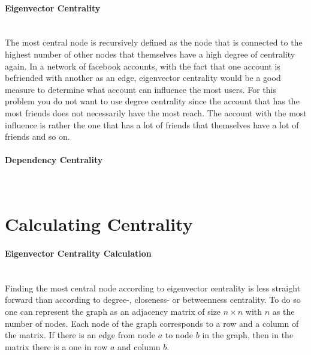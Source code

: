 \paragraph{Eigenvector Centrality}\mbox{} \medskip \\
The most central node is recursively defined as the node that is connected to the highest number
of other nodes that themselves have a high degree of centrality again. In a network of facebook
accounts, with the fact that one account is befriended with another as an edge, eigenvector centrality
would be a good measure to determine what account can influence the most users. For this problem you
do not want to use degree centrality since the account that has the most friends does not necessarily
have the most reach. The account with the most influence is rather the one that has a lot of friends
that themselves have a lot of friends and so on.

\paragraph{Dependency Centrality}\mbox{} \medskip \\


\section{Calculating Centrality}

\paragraph{Eigenvector Centrality Calculation}\mbox{} \medskip \\
Finding the most central node according to eigenvector centrality is less straight forward than 
according to degree-, closeness- or betweenness centrality. To do so one can represent the graph 
as an adjacency matrix of size $n \times n$ with $n$ as the number of nodes. Each node of the graph 
corresponds to a row and a column of the matrix. If there is an edge from node $a$ to node $b$
in the graph, then in the matrix there is a one in row $a$ and column $b$.

\begin {center}
\end{center}


